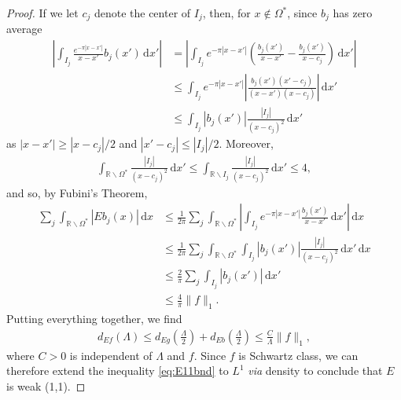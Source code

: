 \documentclass[../dissertation.tex]{subfiles}
\begin{document}
\begin{proof}
    If we let $c_j$ denote the center of $I_j$, then, for $x \notin \Omega^*$, 
    since $b_j$ has zero average
    \begin{align*}
        \left|\int_{I_j} \frac{e^{-\pi|x - x'|}}{x - x'} b_j(x') \, \mathrm{d}x'\right|
            &= \left|\int_{I_j} e^{-\pi|x - x'|}
                \left(\frac{b_j(x')}{x - x'} - \frac{b_j(x')}{x - c_j}  \right)\, \mathrm{d}x'\right| \\
            &\leq \int_{I_j} e^{-\pi|x - x'|}
                \left|\frac{b_j(x')(x' - c_j)}{(x - x')(x-c_j)}\right| \, \mathrm{d}x' \\
            &\leq \int_{I_j} |b_j(x')| \frac{|I_j|}{(x - c_j)^2} \, \mathrm{d}x'
    \end{align*}
    as $|x - x'| \geq |x - c_j|/2$ and $|x' - c_j| \leq |I_j|/2$. Moreover, 
    \begin{align} \label{eq:IjIntBnd}
        \int_{\mathbb R \backslash \Omega^*} \frac{|I_j|}{(x - c_j)^2} \, \mathrm{d}x'
            \leq \int_{\mathbb R \backslash I_j} \frac{|I_j|}{(x - c_j)^2} \, \mathrm{d}x'
            \leq 4,
    \end{align}
    and so, by Fubini's Theorem,
    \begin{align} \label{eq:sumEbj}
        \sum_j \int_{\mathbb R \backslash \Omega^*} \left| E b_j(x) \right| \, \mathrm{d}x
            &\leq \frac{1}{2\pi} \sum_j\int_{\mathbb R \backslash \Omega^*} 
                \left| \int_{I_j} e^{-\pi|x-x'|} \frac{b_j(x')}{x - x'} \, \mathrm{d}x' \right| \, \mathrm{d}x 
                \\
            &\leq \frac{1}{2\pi} \sum_j \int_{\mathbb R \backslash \Omega^*}  \int_{I_j}
                |b_j(x')| \frac{|I_j|}{(x - c_j)^2} \, \mathrm{d}x' \, \mathrm{d}x 
                \nonumber \\
            &\leq \frac{2}{\pi} \sum_j \int_{I_j} |b_j(x')| \, \mathrm{d}x' 
                \nonumber \\
            &\leq \frac{4}{\pi} \| f\|_1. \nonumber
    \end{align}
    Putting everything together, we find
    \begin{align} \label{eq:E11bnd}
        d_{Ef}(\Lambda) 
            \leq d_{Eg}\left(\frac{\Lambda}{2}\right) + d_{Eb}\left(\frac{\Lambda}{2}\right)
            \leq \frac{C}{\Lambda} \| f\|_1,
    \end{align}
    where $C>0$ is independent of $\Lambda$ and $f$. Since $f$ is Schwartz class, we can 
    therefore extend the inequality \eqref{eq:E11bnd} to $L^1$ {\em via} density to
    conclude that $E$ is weak (1,1).
\end{proof}
\end{document}
